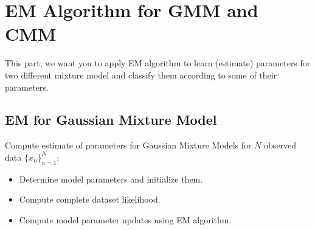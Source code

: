 \section{EM Algorithm for GMM and CMM}

This part, we want you to apply EM algorithm to learn (estimate) parameters for two different mixture model and classify them according to some of their parameters.

\subsection{EM for Gaussian Mixture Model}

Compute estimate of parameters for Gaussian Mixture Models for $N$ observed data $\{x_n\}^N_{n=1}$:
\begin{itemize}
    \item Determine model parameters and initialize them.
    \item Compute complete dataset likelihood.
    \item Compute model parameter updates using EM algorithm.
\end{itemize}
